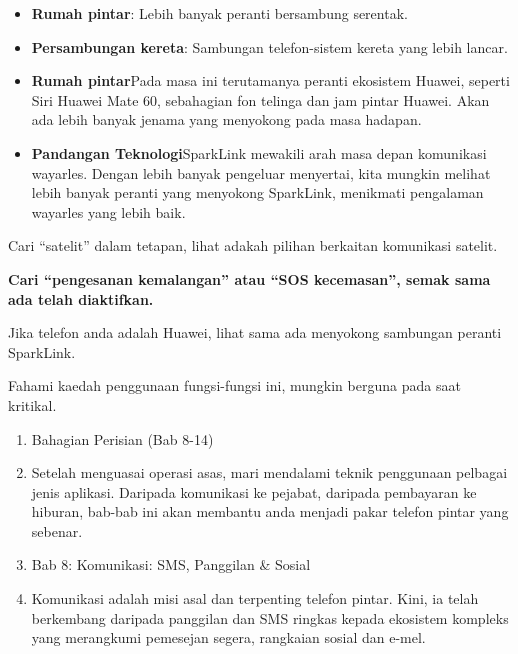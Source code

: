 \begin{itemize}
  \item \textbf{Rumah pintar}: Lebih banyak peranti bersambung serentak.
  \item \textbf{Persambungan kereta}: Sambungan telefon-sistem kereta yang lebih lancar.
  \item \textbf{Rumah pintar}Pada masa ini terutamanya peranti ekosistem Huawei, seperti Siri Huawei Mate 60, sebahagian fon telinga dan jam pintar Huawei. Akan ada lebih banyak jenama yang menyokong pada masa hadapan.
  \item \textbf{Pandangan Teknologi}SparkLink mewakili arah masa depan komunikasi wayarles. Dengan lebih banyak pengeluar menyertai, kita mungkin melihat lebih banyak peranti yang menyokong SparkLink, menikmati pengalaman wayarles yang lebih baik.
\end{itemize}


Cari “satelit” dalam tetapan, lihat adakah pilihan berkaitan komunikasi satelit.

\textbf{Cari “pengesanan kemalangan” atau “SOS kecemasan”, semak sama ada telah diaktifkan.}\par

Jika telefon anda adalah Huawei, lihat sama ada menyokong sambungan peranti SparkLink.

\begin{tcbpractice}{Fahami kaedah penggunaan fungsi-fungsi ini, mungkin berguna pada saat kritikal.}
\begin{enumerate}
  \item Bahagian Perisian (Bab 8-14)
  \item Setelah menguasai operasi asas, mari mendalami teknik penggunaan pelbagai jenis aplikasi. Daripada komunikasi ke pejabat, daripada pembayaran ke hiburan, bab-bab ini akan membantu anda menjadi pakar telefon pintar yang sebenar.
  \item Bab 8: Komunikasi: SMS, Panggilan \& Sosial
  \item Komunikasi adalah misi asal dan terpenting telefon pintar. Kini, ia telah berkembang daripada panggilan dan SMS ringkas kepada ekosistem kompleks yang merangkumi pemesejan segera, rangkaian sosial dan e-mel.
\end{enumerate}

\end{tcbpractice}
